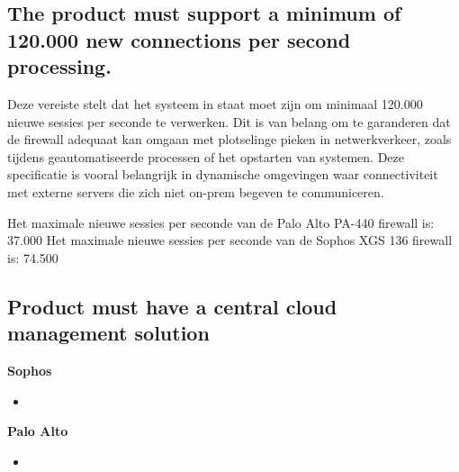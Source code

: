 \subsection{The product must support a minimum of 120.000 new connections per second processing.}
Deze vereiste stelt dat het systeem in staat moet zijn om minimaal 120.000 nieuwe sessies per seconde te verwerken. Dit is van belang om te garanderen dat de firewall adequaat kan omgaan met plotselinge pieken in netwerkverkeer, zoals tijdens geautomatiseerde processen of het opstarten van systemen. Deze specificatie is vooral belangrijk in dynamische omgevingen waar connectiviteit met externe servers die zich niet on-prem begeven te communiceren.

\vspace{5mm}
Het maximale nieuwe sessies per seconde van de Palo Alto PA-440 firewall is: 37.000 \newline
Het maximale nieuwe sessies per seconde van de Sophos XGS 136 firewall is: 74.500

\begin{table}[h!]
    \centering
    \caption{Vergelijking van maximale gelijktijdige sessies en nieuwe verbindingen per seconde voor PA-440 en XGS 136 firewalls.}
\end{table}


\subsection{Product must have a central cloud management solution}


\textbf{Sophos}
\begin{itemize}[label=\textbullet]
    \item 
\end{itemize}

\textbf{Palo Alto}
\begin{itemize}[label=\textbullet]
    \item 
\end{itemize}


